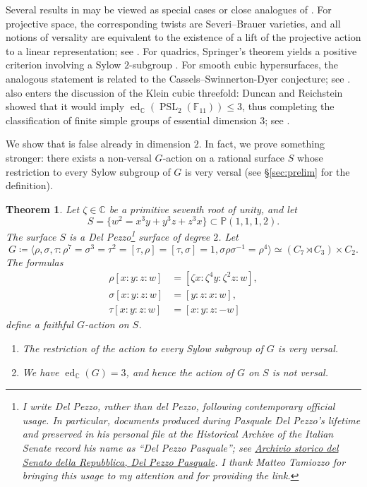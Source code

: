 \documentclass{amsart}
\newtheorem{thm}{Theorem}[section]
\theoremstyle{definition}
\theoremstyle{remark}
\numberwithin{equation}{section}
\newcommand{\F}{\mathbb F}
\newcommand{\C}{\mathbb C}
\newcommand{\ed}{\operatorname{ed}}
\begin{document}
Several results in \cite{Duncan-Reichstein} may be viewed as special cases or
close analogues of .  For projective space, the corresponding twists are Severi--Brauer varieties, and all notions of versality are equivalent to the existence of a lift of the projective action to a linear representation; see \cite[Proposition~9.1]{Duncan-Reichstein}.  For quadrics,
Springer's theorem yields a positive criterion involving a Sylow $2$-subgroup
\cite[Theorem~10.2]{Duncan-Reichstein}.  For smooth cubic hypersurfaces, the
analogous statement is related to the Cassels--Swinnerton-Dyer conjecture; see \cite[Theorem~10.5]{Duncan-Reichstein}.  also enters the discussion of the Klein cubic threefold:
Duncan and Reichstein showed that it would imply
$\ed_{\C}(\operatorname{PSL}_2(\F_{11}))\leq 3$, thus completing the classification of finite simple groups of essential dimension $3$; see \cite[Example 10.7]{Duncan-Reichstein}.

We show that  is false already in dimension $2$. In fact, we prove something stronger: there exists a non-versal $G$-action on a rational surface $S$ whose restriction to every Sylow subgroup of $G$ is very versal (see \S\ref{sec:prelim} for the definition).

\begin{thm}\label{thm:main}
Let $\zeta\in\C$ be a primitive seventh root of unity, and let
\[
 S=\{w^2=x^3y+y^3z+z^3x\}\subset\mathbb P(1,1,1,2).
\]
The surface $S$ is a Del Pezzo\footnote{I write \emph{Del Pezzo}, rather than \emph{del Pezzo}, following contemporary official usage. In particular, documents produced during Pasquale Del Pezzo's lifetime and preserved in his personal file at the Historical Archive of the Italian Senate record his name as ``Del Pezzo Pasquale''; see \href{https://patrimonio.archivio.senato.it/inventario/scheda/ufficio-segreteria/IT-SEN-095-003889/del-pezzo-pasquale}{Archivio storico del Senato della Repubblica, \emph{Del Pezzo Pasquale}}. I thank Matteo Tamiozzo for bringing this usage to my attention and for providing the link.}
 surface of degree $2$. Let
\[G\coloneqq \langle \rho,\sigma,\tau : \rho^7=\sigma^3=\tau^2=[\tau,\rho]=[\tau,\sigma]=1, \sigma\rho\sigma^{-1}=\rho^4\rangle\simeq (C_7\rtimes C_3)\times C_2.\]
The formulas
\begin{align*}
 \rho[x:y:z:w]&=[\zeta x:\zeta^4y:\zeta^2z:w],\\
 \sigma[x:y:z:w]&=[y:z:x:w],\\
 \tau[x:y:z:w]&=[x:y:z:-w]
\end{align*}
define a faithful $G$-action on $S$. 

\begin{enumerate}
    \item The restriction of the action to every Sylow
subgroup of $G$ is very versal.
\item We have $\ed_{\C}(G)=3$, and hence the action of $G$ on $S$ is not
versal.
\end{enumerate}
\end{thm}
\end{document}
